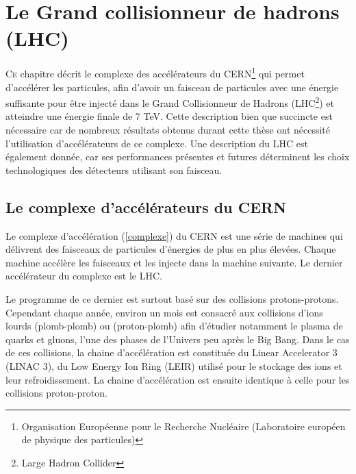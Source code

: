 \chapter{Le Grand collisionneur de hadrons (LHC)}
\renewcommand\chapterillustration{LHC/lhc}
\ThisULCornerWallPaper{1}{\chapterillustration}
\minitoc
\lettrine[lines=4, slope=-0.5em]{C}{e} chapitre décrit le complexe des accélérateurs du CERN\footnote{Organisation Européenne pour le Recherche Nucléaire (Laboratoire européen de physique des particules)} qui permet d'accélérer les particules, afin d'avoir un faisceau de particules avec une énergie suffisante pour être injecté dans le Grand Collisionneur de Hadrons (LHC\footnote{Large Hadron Collider}) et atteindre une énergie finale de $7$ TeV. Cette description bien que succincte est nécessaire car de nombreux résultats obtenus durant cette thèse ont nécessité l'utilisation d'accélérateurs de ce complexe. Une description du LHC est également donnée, car ses performances présentes et futures déterminent les choix technologiques des détecteurs utilisant son faisceau.

\section{Le complexe d'accélérateurs du CERN}

Le complexe d'accélération (\ref{complexe}) du CERN est une série de machines qui délivrent des faisceaux de particules d'énergies de plus en plus élevées. Chaque machine accélère les faisceaux et les injecte dans la machine suivante. Le dernier accélérateur du complexe est le LHC.

Le programme de ce dernier est surtout basé sur des collisions protons-protons. Cependant chaque année, environ un mois est consacré aux collisions d'ions lourds (plomb-plomb) ou (proton-plomb) afin d'étudier notamment le plasma de quarks et gluons, l'une des phases de l'Univers peu après le Big Bang. Dans le cas de ces collisions, la chaine d'accélération est constituée du Linear Accelerator 3 (LINAC 3), du Low Energy Ion Ring (LEIR) utilisé pour le stockage des ions et leur refroidissement. La chaine d'accélération est ensuite identique à celle pour les collisions proton-proton.

